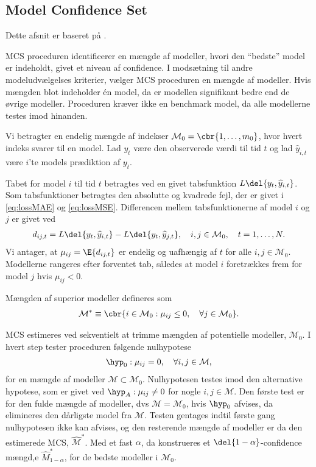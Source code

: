 \subsection{Model Confidence Set}
Dette afsnit er baseret på \citep{mcs2011}.

MCS proceduren identificerer en mængde af modeller, hvori den ``bedste'' model er indeholdt, givet et niveau af confidence.
I modsætning til andre modeludvælgelses kriterier, vælger MCS proceduren en mængde af modeller.
Hvis mængden blot indeholder én model, da er modellen signifikant bedre end de øvrige modeller.
Proceduren kræver ikke en benchmark model, da alle modellerne testes imod hinanden.

Vi betragter en endelig mængde af indekser \(\mathcal{M}_0 = \cbr{1, \ldots, m_0}\), hvor hvert indeks svarer til en model.
Lad \(y_t\) være den observerede værdi til tid \(t\) og lad \(\widehat{y}_{i,t}\) være \(i\)'te models prædiktion af \(y_t\).  

Tabet for model \(i\) til tid \(t\) betragtes ved en givet tabsfunktion \(L \del{y_t, \widehat{y}_{i,t}}\). 
Som tabsfunktioner betragtes den absolutte og kvadrede fejl, der er givet i \eqref{eq:lossMAE} og \eqref{eq:lossMSE}.
Differencen mellem tabsfunktionerne af model \(i\) og \(j\) er givet ved
\begin{align*}
d_{ij,t} = L \del{y_t, \widehat{y}_{i,t}} - L \del{y_t, \widehat{y}_{j,t}}, \quad i, j \in \mathcal{M}_0, \quad t = 1, \ldots, N.
\end{align*}
Vi antager, at \(\mu_{ij} = \E{d_{ij,t}}\) er endelig og uafhængig af \(t\) for alle \( i, j \in \mathcal{M}_0\).
Modellerne rangeres efter forventet tab, således at model \(i\) foretrækkes frem for model \(j\) hvis \(\mu_{ij} < 0\).
%
\begin{defn}
Mængden af superior modeller defineres som
\begin{align*}
\mathcal{M}^* \equiv \cbr{i \in \mathcal{M}_0 : \mu_{ij} \leq 0, \quad \forall j \in \mathcal{M}_0}. 
\end{align*}
\end{defn}
%
MCS estimeres ved sekventielt at trimme mængden af potentielle modeller, \(\mathcal{M}_0\).
I hvert step tester proceduren følgende nulhypotese
\begin{align*}
\hyp_0: \mu_{ij} = 0, \quad \forall i,j \in \mathcal{M},
\end{align*}
for en mængde af modeller \(\mathcal{M} \subset \mathcal{M}_0\).
Nulhypotesen testes imod den alternative hypotese, som er givet ved \(\hyp_A: \mu_{ij} \neq 0\) for nogle \(i, j \in \mathcal{M}\).
Den første test er for den fulde mængde af modeller, dvs \(\mathcal{M} = \mathcal{M}_0\), hvis \(\hyp_0\) afvises, da elimineres den dårligste model fra \(\mathcal{M}\).
Testen gentages indtil første gang nulhypotesen ikke kan afvises, og den resterende mængde af modeller er da den estimerede MCS, \(\widehat{\mathcal{M}}^*\).
Med et fast \(\alpha\), da konstrueres et \(\del{1-\alpha}\)-confidence mængd,e \(\widehat{M}^*_{1-\alpha}\), for de bedste modeller i \(\mathcal{M}_0\).

